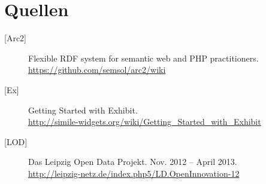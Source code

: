 \documentclass[11pt,a4paper]{article}
\begin{document}
\section{Quellen}

\begin{description}
\item[{[Arc2]}] Flexible RDF system for semantic web and PHP practitioners.\\ 
\url{https://github.com/semsol/arc2/wiki}

\item[{[Ex]}] Getting Started with Exhibit. \\
\url{http://simile-widgets.org/wiki/Getting_Started_with_Exhibit}

\item[{[LOD]}] Das Leipzig Open Data Projekt. Nov. 2012 -- April 2013. \\
\url{http://leipzig-netz.de/index.php5/LD.OpenInnovation-12}

\end{description}
\end{document}
